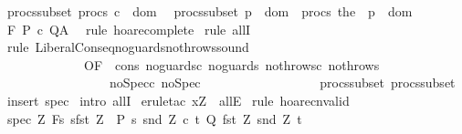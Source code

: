 \begin{isabellebody}
\ procs{\isacharunderscore}subset{\isacharcolon}\ {\isachardoublequoteopen}procs\ c\ {\isasymsubseteq}\ dom\ {\isasymGamma}{\isachardoublequoteclose}\isanewline
{}\ procs{\isacharunderscore}subset{\isacharunderscore}{\isasymGamma}{\isacharcolon}\ {\isachardoublequoteopen}{\isasymforall}p\ {\isasymin}\ dom\ {\isasymGamma}{\isachardot}\ procs\ {\isacharparenleft}the\ {\isacharparenleft}{\isasymGamma}\ p{\isacharparenright}{\isacharparenright}\ {\isasymsubseteq}\ dom\ {\isasymGamma}{\isachardoublequoteclose}\isanewline
{}\ {\isachardoublequoteopen}{\isasymGamma}{\isacharcomma}{\isasymTheta}{\isasymturnstile}\isactrlbsub {\isacharslash}F\isactrlesub \ P\ c\ Q{\isacharcomma}A\ {\isachardoublequoteclose}\isanewline
%
\isadelimproof
%
\endisadelimproof
%
\isatagproof
{}\isamarkupfalse%
\ {\isacharparenleft}rule\ hoare{\isacharunderscore}complete{\isacharprime}{\isacharparenright}\isanewline
{}\isamarkupfalse%
\ {\isacharparenleft}rule\ allI{\isacharparenright}\isanewline
{}\isamarkupfalse%
\ {\isacharparenleft}rule\ LiberalConseq{\isacharunderscore}noguards{\isacharunderscore}nothrows{\isacharunderscore}sound\ \isanewline
\ \ \ \ \ \ \ \ \ \ \ \ \ {\isacharbrackleft}OF\ {\isacharunderscore}\ cons\ noguards{\isacharunderscore}c\ noguards{\isacharunderscore}{\isasymGamma}\ nothrows{\isacharunderscore}c\ nothrows{\isacharunderscore}{\isasymGamma}\ \isanewline
\ \ \ \ \ \ \ \ \ \ \ \ \ \ \ \ \ noSpec{\isacharunderscore}c\ noSpec{\isacharunderscore}{\isasymGamma}\ \isanewline
\ \ \ \ \ \ \ \ \ \ \ \ \ \ \ \ \ procs{\isacharunderscore}subset\ procs{\isacharunderscore}subset{\isacharunderscore}{\isasymGamma}{\isacharbrackright}{\isacharparenright}\isanewline
{}\isamarkupfalse%
\ {\isacharparenleft}insert\ spec{\isacharparenright}\isanewline
{}\isamarkupfalse%
\ {\isacharparenleft}intro\ allI{\isacharparenright}\isanewline
{}\isamarkupfalse%
\ {\isacharparenleft}erule{\isacharunderscore}tac\ x{\isacharequal}Z\ \ allE{\isacharparenright}\isanewline
{}\isamarkupfalse%
\ {\isacharparenleft}rule\ hoare{\isacharunderscore}cnvalid{\isacharparenright}%
\endisatagproof
{\isafoldproof}%
%
\isadelimproof
\isanewline
%
\endisadelimproof
\isanewline
{}\isamarkupfalse%
\ \isanewline
{}\ spec{\isacharcolon}\ {\isachardoublequoteopen}{\isasymforall}Z{\isachardot}\ {\isasymGamma}{\isacharcomma}{\isasymTheta}{\isasymturnstile}\isactrlbsub {\isacharslash}F\isactrlesub {\isacharbraceleft}s{\isachardot}\ s{\isacharequal}fst\ Z\ {\isasymand}\ P\ s\ {\isacharparenleft}snd\ Z{\isacharparenright}{\isacharbraceright}\ c\ {\isacharbraceleft}t{\isachardot}\ Q\ {\isacharparenleft}fst\ Z{\isacharparenright}\ {\isacharparenleft}snd\ Z{\isacharparenright}\ t{\isacharbraceright}{\isacharcomma}{\isacharbraceleft}{\isacharbraceright}{\isachardoublequoteclose}\isanewline

\end{isabellebody}
